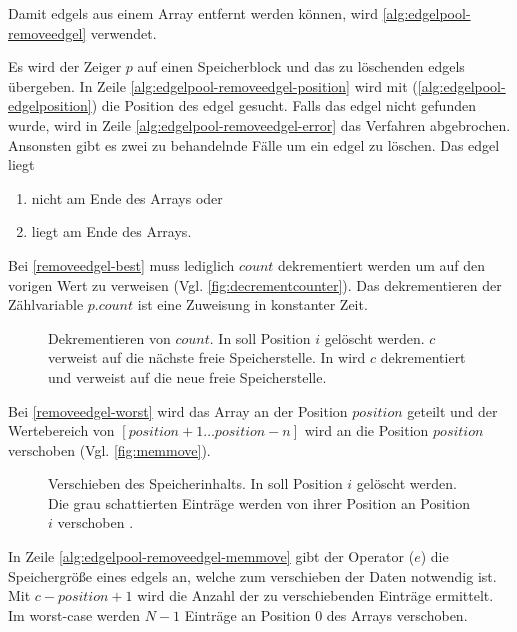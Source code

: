 Damit \glspl{edgel} aus einem Array entfernt werden können, wird \autoref{alg:edgelpool-removeedgel} verwendet.

Es wird der Zeiger $p$ auf einen Speicherblock und das zu löschenden \glspl{edgel} übergeben. In Zeile
 \ref{alg:edgelpool-removeedgel-position} wird mit  (\autoref{alg:edgelpool-edgelposition}) die
 Position des \gls{edgel} gesucht. Falls das \gls{edgel} nicht gefunden wurde, wird in Zeile
 \ref{alg:edgelpool-removeedgel-error} das Verfahren abgebrochen. Ansonsten gibt es zwei zu behandelnde Fälle um ein
 \gls{edgel} zu löschen. Das \gls{edgel} liegt
\begin{enumerate}
	\item nicht am Ende des Arrays oder \label{removeedgel-worst}
	\item liegt am Ende des Arrays. \label{removeedgel-best}
\end{enumerate}
Bei \autoref{removeedgel-best} muss lediglich $\mathit{count}$ dekrementiert werden um auf den vorigen Wert zu
 verweisen (Vgl. \autoref{fig:decrementcounter}). Das dekrementieren der Zählvariable $\mathit{p.count}$ ist eine
 Zuweisung in konstanter Zeit.
\begin{figure}[!ht]
	\centering
	\subfigure[]{
		
		\label{fig:decrementcounter-before}
	}
	\subfigure[]{
		
		\label{fig:decrementcounter-after}
	}
	\caption{Dekrementieren von $\mathit{count}$. In  soll Position $i$ gelöscht
	 werden. $c$ verweist auf die nächste freie Speicherstelle. In  wird $c$
	 dekrementiert und verweist auf die neue freie Speicherstelle.}
	\label{fig:decrementcounter}
\end{figure}
Bei \autoref{removeedgel-worst} wird das Array an der Position $\mathit{position}$ geteilt und der Wertebereich von
 $[\mathit{position}+1 \dotsc \mathit{position}-n]$ wird an die Position $\mathit{position}$ verschoben
 (Vgl. \autoref{fig:memmove}).
\begin{figure}[!ht]
	\centering
	\subfigure[]{
		
		\label{fig:memmove-before}
	}
	\subfigure[]{
		
		\label{fig:memmove-after}
	}
	\caption{Verschieben des Speicherinhalts. In  soll Position $i$ gelöscht werden. Die
	 grau schattierten Einträge werden von ihrer Position an Position $i$ verschoben .}
	\label{fig:memmove}
\end{figure}
In Zeile \ref{alg:edgelpool-removeedgel-memmove} gibt der Operator ($e$) die Speichergröße eines
 \glspl{edgel} an, welche zum verschieben der Daten notwendig ist. Mit $c - \mathit{position} + 1$ wird die Anzahl der
 zu verschiebenden Einträge ermittelt. Im worst-case werden $N-1$ Einträge an Position $0$ des Arrays verschoben.

